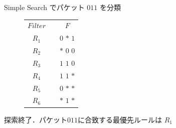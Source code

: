 \documentclass[12pt,dvipdfmx,mathserif,uplatex,aspectratio=32]{beamer}
\makeatletter
\newcommand{\tblcaption}[1]{\def\@captype{table}\caption{#1}}
\makeatother
\begin{document}
\begin{frame}{Simple Search でパケット $011$ を分類}

\begin{figure}[h]
\begin{center}
 \def\@captype{table}
 \begin{minipage}[t]{.58\textwidth}
  \begin{center}
  \begin{tabular}{ccc}
        & &    \\ \hline
 $Filter $& & $F$ \\ \hline
 {\color{red} $R_{1}$} & & $0$ $*$ {\color{red} $1$} \\ 
 $R_{2}$ & & $*$ $0$ $0$ \\ 
 $R_{3}$ & & $1$ $1$ $0$ \\ 
 $R_{4}$ & & $1$ $1$ $*$ \\ 
 $R_{5}$ & & $0$ $*$ $*$ \\ 
 $R_{6}$ & & $*$ $1$ $*$ \\ \hline
  \end{tabular}
  \end{center}
 \end{minipage}
 \hfill
 \begin{minipage}[c]{.40\textwidth}
 \scalebox{0.7}{}
 \end{minipage}
\end{center}
\end{figure}



\vspace{5mm}

探索終了．パケット$011$に合致する最優先ルールは $R_{1}$
\end{frame}
\end{document}
